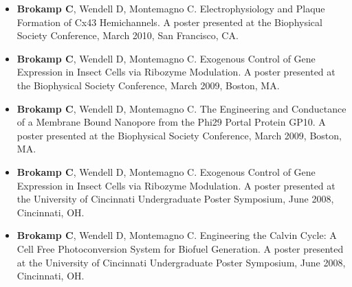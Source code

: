 \documentclass[10pt]{res} %
\begin{document}
\begin{resume}
\begin{itemize}
\item \textbf{Brokamp C}, Wendell D, Montemagno C. Electrophysiology and Plaque Formation of Cx43 Hemichannels.  A poster presented at the Biophysical Society Conference, March 2010, San Francisco, CA.
\item \textbf{Brokamp C}, Wendell D, Montemagno C. Exogenous Control of Gene Expression in Insect Cells via Ribozyme Modulation. A poster presented at the Biophysical Society Conference, March 2009, Boston, MA.
\item \textbf{Brokamp C}, Wendell D, Montemagno C.  The Engineering and Conductance of a Membrane Bound Nanopore from the Phi29 Portal Protein GP10.  A poster presented at the Biophysical Society Conference, March 2009, Boston, MA.
\item \textbf{Brokamp C}, Wendell D, Montemagno C. Exogenous Control of Gene Expression in Insect Cells via Ribozyme Modulation.  A poster presented at the University of Cincinnati Undergraduate Poster Symposium, June 2008, Cincinnati, OH.
\item \textbf{Brokamp C}, Wendell D, Montemagno C. Engineering the Calvin Cycle: A Cell Free Photoconversion System for Biofuel Generation.  A poster presented at the University of Cincinnati Undergraduate Poster Symposium, June 2008, Cincinnati, OH.
\end{itemize}


\end{resume}
\end{document}
